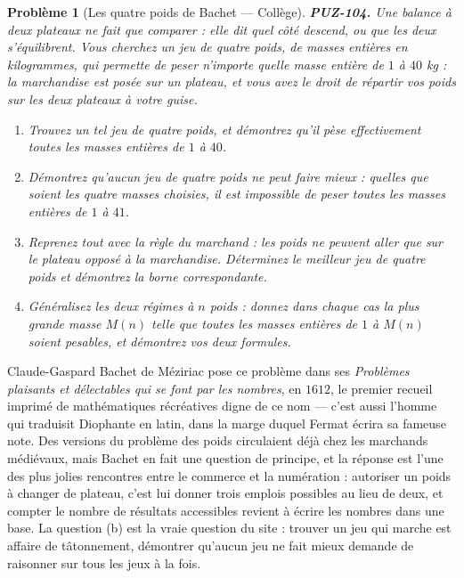 \documentclass[11pt]{article}
\newtheorem{problem}{Problème}
\begin{document}
\bigskip

\begin{problem}[{Les quatre poids de Bachet --- Collège}]
\textbf{PUZ-104.} Une balance à deux plateaux ne fait que comparer : elle dit quel côté
descend, ou que les deux s'équilibrent. Vous cherchez un jeu de quatre poids, de masses
entières en kilogrammes, qui permette de peser n'importe quelle masse entière de $ 1 $ à
$ 40 $ kg : la marchandise est posée sur un plateau, et vous avez le droit de répartir vos
poids sur les \textit{deux} plateaux à votre guise.
\begin{enumerate}
\item[(a)] Trouvez un tel jeu de quatre poids, et démontrez qu'il pèse effectivement toutes les
masses entières de $ 1 $ à $ 40 $.
\item[(b)] Démontrez qu'aucun jeu de quatre poids ne peut faire mieux : quelles que soient les quatre
masses choisies, il est impossible de peser toutes les masses entières de $ 1 $ à
$ 41 $.
\item[(c)] Reprenez tout avec la règle du marchand : les poids ne peuvent aller que sur le plateau
opposé à la marchandise. Déterminez le meilleur jeu de quatre poids et démontrez la borne
correspondante.
\item[(d)] Généralisez les deux régimes à $ n $ poids : donnez dans chaque cas la plus grande masse
$ M(n) $ telle que toutes les masses entières de $ 1 $ à $ M(n) $ soient pesables, et
démontrez vos deux formules.
\end{enumerate}

\end{problem}

\noindent Claude-Gaspard Bachet de Méziriac pose ce problème dans ses \textit{Problèmes
plaisants et délectables qui se font par les nombres}, en $ 1612 $, le premier recueil
imprimé de mathématiques récréatives digne de ce nom --- c'est aussi l'homme qui traduisit
Diophante en latin, dans la marge duquel Fermat écrira sa fameuse note. Des versions du
problème des poids circulaient déjà chez les marchands médiévaux, mais Bachet en fait une
question de principe, et la réponse est l'une des plus jolies rencontres entre le commerce et
la numération : autoriser un poids à changer de plateau, c'est lui donner trois emplois
possibles au lieu de deux, et compter le nombre de résultats accessibles revient à écrire les
nombres dans une base. La question (b) est la vraie question du site : trouver un jeu qui
marche est affaire de tâtonnement, démontrer qu'aucun jeu ne fait mieux demande de raisonner
sur tous les jeux à la fois.
\end{document}
